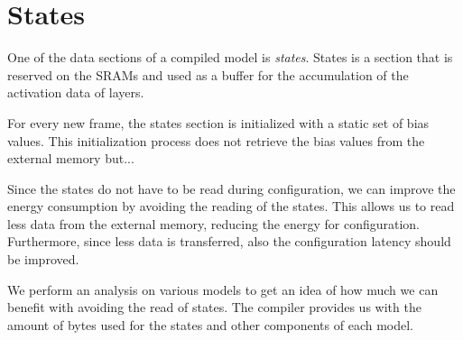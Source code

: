 \section{States}
One of the data sections of a compiled model is \textit{states}.
States is a section that is reserved on the SRAMs and used as a buffer for the accumulation of the activation data of layers.

For every new frame, the states section is initialized with a static set of bias values.
This initialization process does not retrieve the bias values from the external memory but...

Since the states do not have to be read during configuration, we can improve the energy consumption by avoiding the reading of the states.
This allows us to read less data from the external memory, reducing the energy for configuration.
Furthermore, since less data is transferred, also the configuration latency should be improved.

We perform an analysis on various models to get an idea of how much we can benefit with avoiding the read of states.
The compiler provides us with the amount of bytes used for the states and other components of each model.

